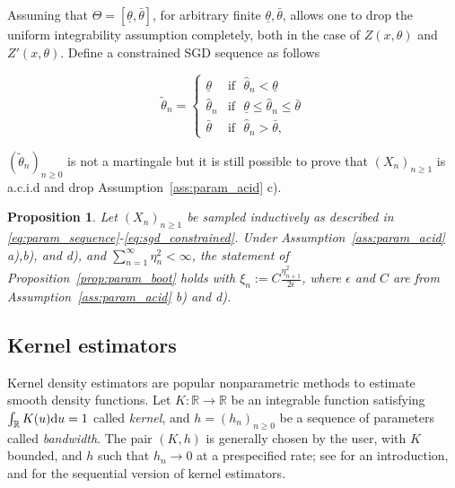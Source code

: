 \documentclass{article}
\newtheorem{proposition}{Proposition}
\theoremstyle{definition}
\newcommand{\di}{{\rm d}}
\renewcommand{\&}{and}
\begin{document}
Assuming that $\Theta=[\underline{\theta},\bar{\theta}]$, for arbitrary finite $\underline{\theta},\bar{\theta}$, allows one to drop the uniform integrability assumption completely, both in the case of $Z(x,\theta)$ and $Z'(x,\theta)$. Define a constrained SGD sequence as follows

\begin{equation}\label{eq:sgd_constrained}
			\tilde{\theta}_n=\begin{cases}
				\underline{\theta} & \text{if } \,\, \hat{\theta}_n <\underline{\theta}\\
				\hat{\theta}_n & \text{if } \,\, \underline{\theta}\leq \hat{\theta}_n \leq \bar{\theta} \\
				 \bar{\theta} & \text{if } \,\, \hat{\theta}_n >\bar{\theta},
			\end{cases}
\end{equation}

$(\tilde{\theta}_n)_{n \geq 0}$  is not a martingale but it is still possible to prove that $(X_{n})_{n\geq 1}$ is a.c.i.d and drop Assumption~\ref{ass:param_acid} c). 

\begin{proposition}\label{prop:param_boot_constrained}Let $(X_n)_{n \geq 1}$ be sampled inductively as described in \eqref{eq:param_sequence}-\eqref{eq:sgd_constrained}. Under Assumption~\ref{ass:param_acid} a),b), and d), %
and $\sum_{n=1}^{\infty} \eta^2_n<\infty$, the statement of Proposition~\ref{prop:param_boot} holds with $\xi_{n}:=C \frac{\eta_{n+1}^2}{2\epsilon}$, where $\epsilon$ and $C$ are from Assumption~\ref{ass:param_acid} b) and d). 
\end{proposition}

 

\subsection{Kernel estimators}\label{sec:kernel}

Kernel density estimators are popular nonparametric methods to estimate smooth density functions.  Let $K:\mathbb{R}\to \mathbb{R}$ be 
an integrable function satisfying $\int_{\mathbb{R}}K(u)\di u=1$ called \textit{kernel}, and $h=(h_{n})_{n\geq 0}$ be a sequence of parameters called \textit{bandwidth}. The pair $(K,h)$ is generally chosen by the user, with $K$ bounded, and $h$  such that $h_n \to 0$ at a prespecified rate; see \cite{silverman2018density} for an introduction, and \cite{wolverton1969asymptotically} for the sequential version of kernel estimators.
\end{document}
